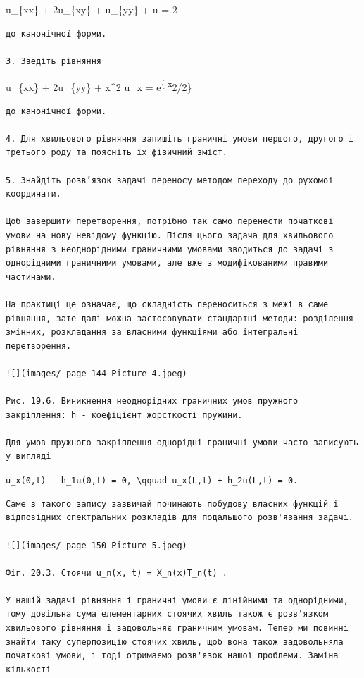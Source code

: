 \documentclass[
  ukrainian,
]{article}
\begin{document}
u\_\{xx\} + 2u\_\{xy\} + u\_\{yy\} + u = 2

\begin{verbatim}
до канонічної форми.

3. Зведіть рівняння
\end{verbatim}

u\_\{xx\} + 2u\_\{yy\} + x\^{}2 u\_x = e\textsuperscript{\{-x}2/2\}

\begin{verbatim}
до канонічної форми.

4. Для хвильового рівняння запишіть граничні умови першого, другого і третього роду та поясніть їх фізичний зміст.

5. Знайдіть розв’язок задачі переносу методом переходу до рухомої координати.

Щоб завершити перетворення, потрібно так само перенести початкові умови на нову невідому функцію. Після цього задача для хвильового рівняння з неоднорідними граничними умовами зводиться до задачі з однорідними граничними умовами, але вже з модифікованими правими частинами.

На практиці це означає, що складність переноситься з межі в саме рівняння, зате далі можна застосовувати стандартні методи: розділення змінних, розкладання за власними функціями або інтегральні перетворення.

![](images/_page_144_Picture_4.jpeg)

Рис. 19.6. Виникнення неоднорідних граничних умов пружного закріплення: h - коефіцієнт жорсткості пружини.

Для умов пружного закріплення однорідні граничні умови часто записують у вигляді
\end{verbatim}

\texttt{u\_x(0,t)\ -\ h\_1u(0,t)\ =\ 0,\ \textbackslash{}qquad\ u\_x(L,t)\ +\ h\_2u(L,t)\ =\ 0.}

\begin{verbatim}
Саме з такого запису зазвичай починають побудову власних функцій і відповідних спектральних розкладів для подальшого розв'язання задачі.

![](images/_page_150_Picture_5.jpeg)

Фіг. 20.3. Стоячи u_n(x, t) = X_n(x)T_n(t) .

У нашій задачі рівняння і граничні умови є лінійними та однорідними, тому довільна сума елементарних стоячих хвиль також є розв'язком хвильового рівняння і задовольняє граничним умовам. Тепер ми повинні знайти таку суперпозицію стоячих хвиль, щоб вона також задовольняла початкові умови, і тоді отримаємо розв'язок нашої проблеми. Заміна кількості
\end{verbatim}
\end{document}
